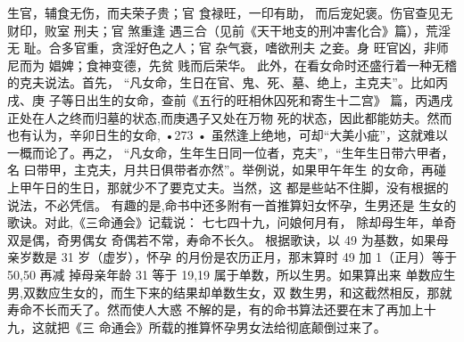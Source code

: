 生官，辅食无伤，而夫荣子贵；官 食禄旺，一印有助，
而后宠妃褒。伤官查见无财印，败室 刑夫；官 煞重逢
遇三合（见前《天干地支的刑冲害化合》篇），荒淫无
耻。合多官重，贪淫好色之人；官 杂气衰，嗜欲刑夫
之妾。身 旺官凶，非师 尼而为 娼婢；食神变德，先贫
贱而后荣华。
此外，在看女命时还盛行着一种无稽的克夫说法。首先，
“凡女命，生日在官、鬼、死、墓、绝上，主克夫”。比如丙戌、庚
子等日出生的女命，查前《五行的旺相休囚死和寄生十二宫》
篇，丙遇戌正处在人之终而归墓的状态,而庚遇子又处在万物
死的状态，因此都能妨夫。然而也有认为，辛卯日生的女命,
•273 •
虽然逢上绝地，可却“大美小疵”，这就难以一概而论了。再之，
“凡女命，生年生日同一位者，克夫”，“生年生日带六甲者，名
曰带甲，主克夫，月共日俱带者亦然”。举例说，如果甲午年生
的女命，再碰上甲午日的生日，那就少不了要克丈夫。当然，这
都是些站不住脚，没有根据的说法，不必凭信。
有趣的是,命书中还多附有一首推算妇女怀孕，生男还是
生女的歌诀。对此,《三命通会》记载说：
七七四十九，问娘何月有，
除却母生年，单奇双是偶，奇男偶女
奇偶若不常，寿命不长久。
根据歌诀，以 49 为基数，如果母亲岁数是 31 岁（虚岁），怀孕
的月份是农历正月，那末算时 49 加 1（正月）等于 50,50 再减
掉母亲年龄 31 等于 19,19 属于单数，所以生男。如果算出来
单数应生男,双数应生女的，而生下来的结果却单数生女，双
数生男，和这截然相反，那就寿命不长而夭了。然而使人大惑
不解的是，有的命书算法还要在末了再加上十九，这就把《三
命通会》所载的推算怀孕男女法给彻底颠倒过来了。

